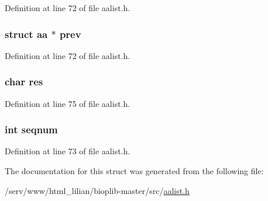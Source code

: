 Definition at line 72 of file aalist.\-h.

\hypertarget{structaa_addb71ee233c0a2d03f6fd3b2cc24f9e4}{
\subsubsection[{prev}]{\setlength{\rightskip}{0pt plus 5cm}struct {\bf aa} $\ast$ prev}}\label{structaa_addb71ee233c0a2d03f6fd3b2cc24f9e4}


Definition at line 72 of file aalist.\-h.

\hypertarget{structaa_a7b47a2f568f2f7b30337241f588e8845}{
\subsubsection[{res}]{\setlength{\rightskip}{0pt plus 5cm}char res}}\label{structaa_a7b47a2f568f2f7b30337241f588e8845}


Definition at line 75 of file aalist.\-h.

\hypertarget{structaa_a54d0bde7289ee46d2643ee7c676635b3}{
\subsubsection[{seqnum}]{\setlength{\rightskip}{0pt plus 5cm}int seqnum}}\label{structaa_a54d0bde7289ee46d2643ee7c676635b3}


Definition at line 73 of file aalist.\-h.



The documentation for this struct was generated from the following file\-:\begin{DoxyCompactItemize}
\item 
/serv/www/html\-\_\-lilian/bioplib-\/master/src/\hyperlink{aalist_8h}{aalist.\-h}\end{DoxyCompactItemize}
